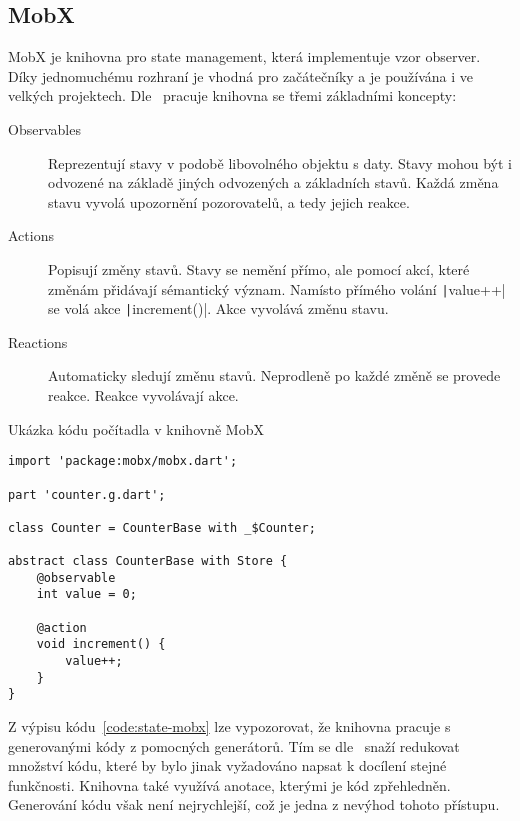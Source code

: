 \subsection{MobX}

MobX je knihovna pro state management,
která implementuje vzor observer.
Díky jednomuchému rozhraní je vhodná pro začátečníky
a je používána i ve velkých projektech.
Dle~\cite{mobx_core_concepts} pracuje knihovna se třemi základními koncepty:

\begin{description}
    \item[Observables] Reprezentují stavy v podobě libovolného objektu s daty.
    Stavy mohou být i odvozené na základě jiných odvozených a základních stavů.
    Každá změna stavu vyvolá upozornění pozorovatelů, a tedy jejich reakce.
    \item[Actions] Popisují změny stavů.
    Stavy se nemění přímo,
    ale pomocí akcí,
    které změnám přidávají sémantický význam.
    Namísto přímého volání \texttt|value++| se volá akce
    \texttt|increment()|.
    Akce vyvolává změnu stavu.
    \item[Reactions] Automaticky sledují změnu stavů.
    Neprodleně po každé změně se provede reakce.
    Reakce vyvolávají akce.
\end{description}

\begin{listing}
    \caption{Ukázka kódu počítadla v knihovně MobX~\cite{mobx_core_concepts}}
    \label{code:state-mobx}
    \begin{verbatim}
import 'package:mobx/mobx.dart';

part 'counter.g.dart';

class Counter = CounterBase with _$Counter;

abstract class CounterBase with Store {
    @observable
    int value = 0;

    @action
    void increment() {
        value++;
    }
}
    \end{verbatim}
\end{listing}

Z výpisu kódu~\ref{code:state-mobx} lze vypozorovat,
že knihovna pracuje s generovanými kódy z pomocných generátorů.
Tím se dle~\cite{mobx_core_concepts} snaží redukovat množství kódu,
které by bylo jinak vyžadováno napsat k docílení stejné funkčnosti.
Knihovna také využívá anotace,
kterými je kód zpřehledněn.
Generování kódu však není nejrychlejší,
což je jedna z nevýhod tohoto přístupu.

